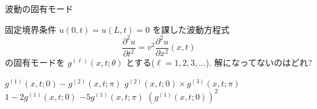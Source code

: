 \makeatletter  
{}%
\makeatother


\begin{theme}{波動の固有モード}
  \begin{memo}    
  \end{memo}
  \begin{prob}
    固定境界条件 $u(0,t)=u(L,t)=0$ を課した波動方程式
    $$\frac{\partial^2 u}{\partial t^2}=v^2\frac{\partial^2 u}{\partial x^2}(x,t)$$
の固有モードを $g^{(\ell)}(x,t;\theta)$ とする($\ell=1,2,3,\ldots$). 解になってないのはどれ?
    \begin{enumerate}
    \itemfalse $g^{(1)}(x,t;0)-g^{(2)}(x,t;\pi)$
    \itemtrue $g^{(2)}(x,t;0)\times g^{(3)}(x,t;\pi)$
    \itemtrue $1-2g^{(1)}(x,t;0)$
    \itemfalse $-5g^{(1)}(x,t;\pi)$
    \itemtrue $(g^{(1)}(x,t;0))^2$
    \end{enumerate}
  \end{prob}
  \begin{sol}

  \end{sol}
\end{theme}

\makeatletter
{}
\makeatother

